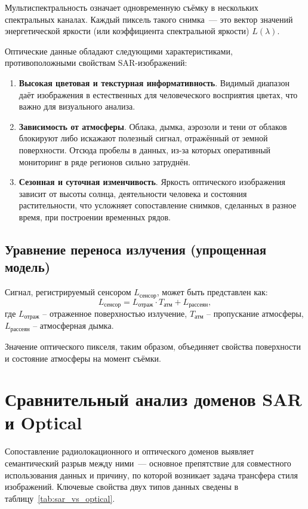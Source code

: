 Мультиспектральность означает одновременную съёмку в нескольких спектральных каналах.
Каждый пиксель такого снимка~--- это вектор значений энергетической яркости (или коэффициента спектральной яркости) $L(\lambda)$.

Оптические данные обладают следующими характеристиками, противоположными свойствам SAR-изображений:
\begin{enumerate}[label*=\arabic*.]
    \item \textbf{Высокая цветовая и текстурная информативность}. Видимый диапазон даёт изображения в естественных для человеческого восприятия цветах, что важно для визуального анализа.
    \item \textbf{Зависимость от атмосферы}. Облака, дымка, аэрозоли и тени от облаков блокируют либо искажают полезный сигнал, отражённый от земной поверхности. Отсюда пробелы в данных, из-за которых оперативный мониторинг в ряде регионов сильно затруднён.
    \item \textbf{Сезонная и суточная изменчивость}. Яркость оптического изображения зависит от высоты солнца, деятельности человека и состояния растительности, что усложняет сопоставление снимков, сделанных в разное время, при построении временных рядов.
\end{enumerate}

\subsection{Уравнение переноса излучения (упрощенная модель)}
Сигнал, регистрируемый сенсором $L_\text{сенсор}$, может быть представлен как:
$$
L_\text{сенсор} = L_\text{отраж} \cdot T_\text{атм} + L_\text{рассеян},
$$
где $L_\text{отраж}$ -- отраженное поверхностью излучение,
$T_\text{атм}$ -- пропускание атмосферы,
$L_\text{рассеян}$ -- атмосферная дымка.

Значение оптического пикселя, таким образом, объединяет свойства поверхности и состояние атмосферы на момент съёмки.

\section{Сравнительный анализ доменов SAR и Optical}
Сопоставление радиолокационного и оптического доменов выявляет семантический разрыв между ними~--- основное препятствие для совместного использования данных и причину, по которой возникает задача трансфера стиля изображений.
Ключевые свойства двух типов данных сведены в таблицу~\ref{tab:sar_vs_optical}.

